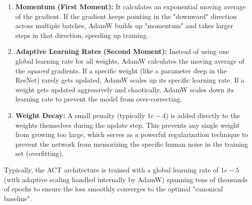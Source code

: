 \documentclass[11pt,a4paper]{article}
\begin{document}
\begin{enumerate}
    \item \textbf{Momentum (First Moment):} It calculates an exponential moving average of the gradient. If the gradient keeps pointing in the "downward" direction across multiple batches, AdamW builds up "momentum" and takes larger steps in that direction, speeding up training.
    \item \textbf{Adaptive Learning Rates (Second Moment):} Instead of using one global learning rate for all weights, AdamW calculates the moving average of the \textit{squared} gradients. If a specific weight (like a parameter deep in the ResNet) rarely gets updated, AdamW scales up its specific learning rate. If a weight gets updated aggressively and chaotically, AdamW scales down its learning rate to prevent the model from over-correcting.
    \item \textbf{Weight Decay:} A small penalty (typically $1e-4$) is added directly to the weights themselves during the update step. This prevents any single weight from growing too large, which serves as a powerful regularization technique to prevent the network from memorizing the specific human noise in the training set (overfitting).
\end{enumerate}

Typically, the ACT architecture is trained with a global learning rate of $1e-5$ (with adaptive scaling handled internally by AdamW) spanning tens of thousands of epochs to ensure the loss smoothly converges to the optimal "canonical baseline".
\end{document}
